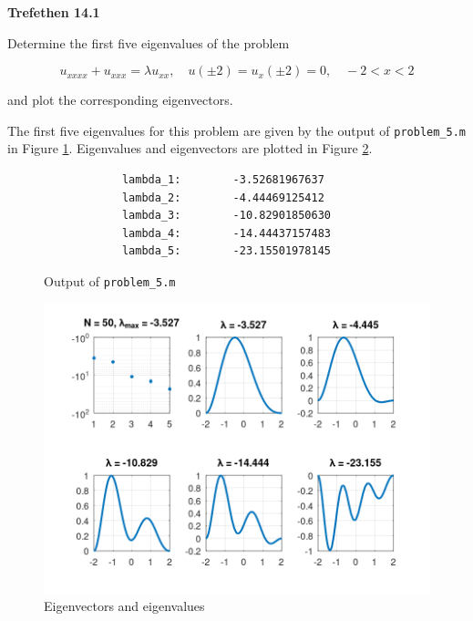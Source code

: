 \textbf{Trefethen 14.1}

Determine the first five eigenvalues of the problem

$$
u_{xxxx} + u_{xxx} = \lambda u_{xx}, \quad u(\pm 2) = u_x(\pm 2) = 0, \quad -2 < x < 2
$$

and plot the corresponding eigenvectors.

\begin{solution}
    The first five eigenvalues for this problem are given by the output of \texttt{problem\_5.m} in Figure 
    \ref{fig:problem_5_eigenvalues}. Eigenvalues and eigenvectors are plotted in Figure \ref{fig:problem_5_eigenvectors}.

    \begin{figure}[h]
        \begin{verbatim}
            lambda_1:        -3.52681967637 
            lambda_2:        -4.44469125412 
            lambda_3:        -10.82901850630 
            lambda_4:        -14.44437157483 
            lambda_5:        -23.15501978145
        \end{verbatim}
        \caption{Output of \texttt{problem\_5.m}}
        \label{fig:problem_5_eigenvalues}
    \end{figure}

    \begin{figure}[h]
        \includegraphics*[width=.90\textwidth]{problem_5.png}
        \caption{Eigenvectors and eigenvalues}
        \label{fig:problem_5_eigenvectors}
    \end{figure}
\end{solution}